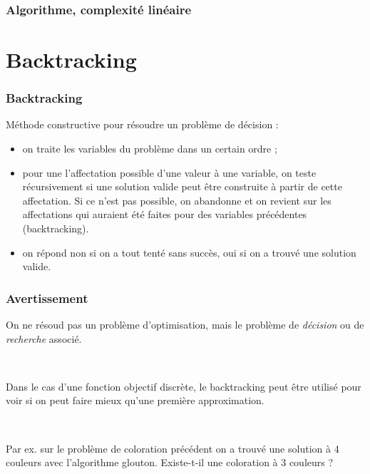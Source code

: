 \documentclass{beamer}
\begin{document}
\begin{frame}
  \frametitle{Algorithme, complexité linéaire}

  
\end{frame}

\section{Backtracking}

\begin{frame}
  \frametitle{Backtracking}

  Méthode constructive pour résoudre un problème de décision :
  \begin{itemize}
  \item on traite les variables du problème dans un certain ordre ;
  \item pour une l'affectation possible d'une valeur à une variable, on teste récursivement si une solution valide peut être construite à partir de cette affectation. Si ce n'est pas possible, on abandonne et on revient sur les affectations qui auraient été faites pour des variables précédentes (backtracking).
  \item on répond non si on a tout tenté sans succès, oui si on a trouvé une solution valide. 
  \end{itemize}
  
\end{frame}

\begin{frame}
  \frametitle{Avertissement}

  On ne résoud pas un problème d'optimisation, mais le problème de \emph{décision}
  ou de \emph{recherche} associé.

  ~

  Dans le cas d'une fonction objectif discrète, le backtracking peut être
  utilisé pour voir si on peut faire mieux qu'une première approximation.

  ~
  
  Par ex. sur le problème de coloration précédent on a trouvé une solution
  à 4 couleurs avec l'algorithme glouton. Existe-t-il une coloration à 3 couleurs ?
  
\end{frame}
\end{document}
